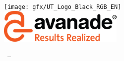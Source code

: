\begin{titlepage}
	\begin{addmargin}[-1cm]{-3cm}
    \begin{center}
        \large  

        \hfill

        \vfill

        \begingroup
            \color{Maroon}\spacedallcaps{\myTitle} \\ \bigskip
            \mySubtitle \\ \medskip 
        \endgroup

        \spacedlowsmallcaps{\myName\myDegree} \\
        \myDepartment \\                            
        \myFaculty \\
        \myUni \\ \bigskip

        \vfill

        \texttt{[image: gfx/UT\_Logo\_Black\_RGB\_EN]} \\
        \includegraphics[width=6cm]{gfx/ava_tag_color_rgb} \\ \medskip

        \myTime\ -- \myVersion

        \vfill                      

    \end{center}  
  \end{addmargin}       
\end{titlepage}   